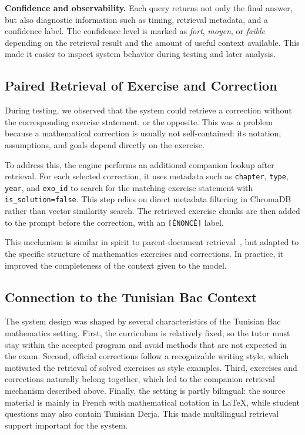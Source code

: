 \textbf{Confidence and observability.} Each query returns not only the final
answer, but also diagnostic information such as timing, retrieval metadata,
and a confidence label. The confidence level is marked as \textit{fort},
\textit{moyen}, or \textit{faible} depending on the retrieval result and the
amount of useful context available. This made it easier to inspect system
behavior during testing and later analysis.

\subsection{Paired Retrieval of Exercise and Correction}
\label{subsec:paired-retrieval}

During testing, we observed that the system could retrieve a correction
without the corresponding exercise statement, or the opposite. This was a
problem because a mathematical correction is usually not self-contained: its
notation, assumptions, and goals depend directly on the exercise.

To address this, the engine performs an additional companion lookup after
retrieval. For each selected correction, it uses metadata such as
\texttt{chapter}, \texttt{type}, \texttt{year}, and \texttt{exo\_id} to
search for the matching exercise statement with
\texttt{is\_solution=false}. This step relies on direct metadata filtering
in ChromaDB rather than vector similarity search. The retrieved exercise
chunks are then added to the prompt before the correction, with an
\texttt{[\'ENONC\'E]} label.

This mechanism is similar in spirit to parent-document
retrieval~\cite{gao2024rag_survey}, but adapted to the specific structure of
mathematics exercises and corrections. In practice, it improved the
completeness of the context given to the model.

\subsection{Connection to the Tunisian Bac Context}
\label{subsec:bac-context}

The system design was shaped by several characteristics of the Tunisian Bac
mathematics setting. First, the curriculum is relatively fixed, so the tutor
must stay within the accepted program and avoid methods that are not
expected in the exam. Second, official corrections follow a recognizable
writing style, which motivated the retrieval of solved exercises as style
examples. Third, exercises and corrections naturally belong together, which
led to the companion retrieval mechanism described above. Finally, the
setting is partly bilingual: the source material is mainly in French with
mathematical notation in \LaTeX{}, while student questions may also contain
Tunisian Derja. This made multilingual retrieval support important for the
system.

